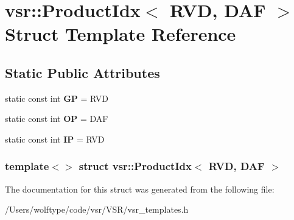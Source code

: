 \hypertarget{structvsr_1_1_product_idx_3_01_r_v_d_00_01_d_a_f_01_4}{\section{vsr\-:\-:Product\-Idx$<$ R\-V\-D, D\-A\-F $>$ Struct Template Reference}
\label{structvsr_1_1_product_idx_3_01_r_v_d_00_01_d_a_f_01_4}
}
\subsection*{Static Public Attributes}
\begin{DoxyCompactItemize}
\item 
\hypertarget{structvsr_1_1_product_idx_3_01_r_v_d_00_01_d_a_f_01_4_a70d52e9e29b3ddd2d0d9718e993662ff}{static const int {\bfseries G\-P} = R\-V\-D}\label{structvsr_1_1_product_idx_3_01_r_v_d_00_01_d_a_f_01_4_a70d52e9e29b3ddd2d0d9718e993662ff}

\item 
\hypertarget{structvsr_1_1_product_idx_3_01_r_v_d_00_01_d_a_f_01_4_a499494355a205a790d69178dcbfe7419}{static const int {\bfseries O\-P} = D\-A\-F}\label{structvsr_1_1_product_idx_3_01_r_v_d_00_01_d_a_f_01_4_a499494355a205a790d69178dcbfe7419}

\item 
\hypertarget{structvsr_1_1_product_idx_3_01_r_v_d_00_01_d_a_f_01_4_ab629e4d8f852b3f338897874233b2ffe}{static const int {\bfseries I\-P} = R\-V\-D}\label{structvsr_1_1_product_idx_3_01_r_v_d_00_01_d_a_f_01_4_ab629e4d8f852b3f338897874233b2ffe}

\end{DoxyCompactItemize}
\subsubsection*{template$<$$>$ struct vsr\-::\-Product\-Idx$<$ R\-V\-D, D\-A\-F $>$}



The documentation for this struct was generated from the following file\-:\begin{DoxyCompactItemize}
\item 
/\-Users/wolftype/code/vsr/\-V\-S\-R/vsr\-\_\-templates.\-h\end{DoxyCompactItemize}
